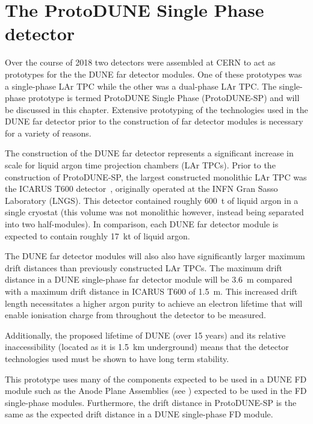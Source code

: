 \chapter{The ProtoDUNE Single Phase detector}
\label{sec:protodune}

Over the course of 2018 two detectors were assembled at CERN to act as prototypes for the the DUNE far detector modules.
One of these prototypes was a single-phase LAr TPC while the other was a dual-phase LAr TPC.
The single-phase prototype is termed ProtoDUNE Single Phase (ProtoDUNE-SP) and will be discussed in this chapter.
Extensive prototyping of the technologies used in the DUNE far detector prior to the construction of far detector modules is necessary for a variety of reasons.

The construction of the DUNE far detector represents a significant increase in scale for liquid argon time projection chambers (LAr TPCs).
Prior to the construction of ProtoDUNE-SP, the largest constructed monolithic LAr TPC was the ICARUS T600 detector~\cite{icarus}, originally operated at the INFN Gran Sasso Laboratory (LNGS).
This detector contained roughly \SI{600}{\tonne} of liquid argon in a single cryostat (this volume was not monolithic however, instead being separated into two half-modules).
In comparison, each DUNE far detector module is expected to contain roughly \SI{17}{\kilo\tonne} of liquid argon.

The DUNE far detector modules will also also have significantly larger maximum drift distances than previously constructed LAr TPCs.
The maximum drift distance in a DUNE single-phase far detector module will be \SI{3.6}{\m} compared with a maximum drift distance in ICARUS T600 of \SI{1.5}{\m}.
This increased drift length necessitates a higher argon purity to achieve an electron lifetime that will enable ionisation charge from throughout the detector to be measured.

Additionally, the proposed lifetime of DUNE (over 15 years) and its relative inaccessibility (located as it is \SI{1.5}{\kilo\metre} underground) means that the detector technologies used must be shown to have long term stability.

This prototype uses many of the components expected to be used in a DUNE FD module such as the Anode Plane Assemblies (see ) expected to be used in the FD single-phase modules.
Furthermore, the drift distance in ProtoDUNE-SP is the same as the expected drift distance in a DUNE single-phase FD module.

